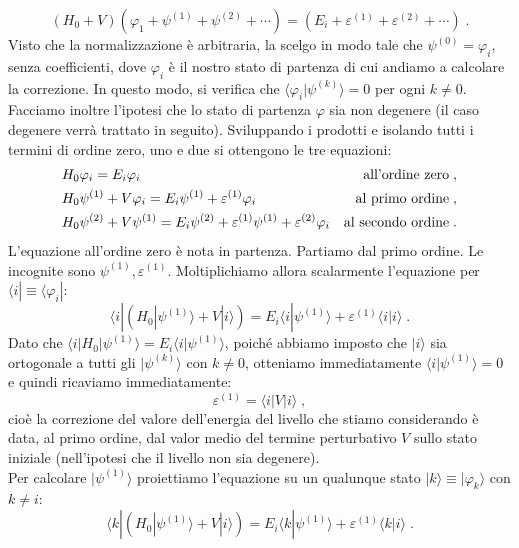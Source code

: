 \documentclass[10pt,a4paper]{report}
\theoremstyle{definition}
\numberwithin{equation}{section}
\newcommand{\bra}{\langle}
\newcommand{\ket}{\rangle}
\begin{document}
\begin{equation}
(H_0+V)(\varphi_1+\psi^{(1)}+\psi^{(2)}+\cdots)=(E_i+\varepsilon^{(1)}+\varepsilon^{(2)}+\cdots)\;.
\end{equation}
Visto che la normalizzazione è arbitraria, la scelgo in modo tale che $\psi^{(0)}=\varphi_i$, senza coefficienti, dove $\varphi_i$ è il nostro stato di partenza di cui andiamo a calcolare la correzione. In questo modo, si verifica che $\bra\varphi_i|\psi^{(k)}\ket=0$ per ogni $k\ne 0$. Facciamo inoltre l'ipotesi che lo stato di partenza $\varphi$ sia non degenere (il caso degenere verrà trattato in seguito). Sviluppando i prodotti e isolando tutti i termini di ordine zero, uno e due si ottengono le tre equazioni:
\begin{align}
&H_0\varphi_i = E_i\varphi_i &\mbox{all'ordine zero}\;, \notag \\
&H_0\psi^{(1)}+V\varphi_i = E_i\psi^{(1)}+\varepsilon^{(1)}\varphi_i &\mbox{al primo ordine} \notag\;, \\
&H_0\psi^{(2)}+V\psi^{(1)} = E_i\psi^{(2)}+\varepsilon^{(1)}\psi^{(1)}+\varepsilon^{(2)}\varphi_i &\mbox{al secondo ordine}\;.
\end{align}
L'equazione all'ordine zero è nota in partenza. Partiamo dal primo ordine. Le incognite sono $\psi^{(1)},\varepsilon^{(1)}$. Moltiplichiamo allora scalarmente l'equazione per $\bra i|\equiv \bra \varphi_i|$:
\begin{equation}
\bra i|\left(H_0|\psi^{(1)}\ket+V|i\ket\right)=E_i\bra i|\psi^{(1)}\ket+\varepsilon^{(1)}\bra i|i\ket\;.
\end{equation}
Dato che $\bra i|H_0|\psi^{(1)}\ket=E_i\bra i|\psi^{(1)}\ket$, poiché abbiamo imposto che $|i\ket$ sia ortogonale a tutti gli $|\psi^{(k)}\ket$ con $k\ne 0$, otteniamo immediatamente $\bra i|\psi^{(1)}\ket=0$ e quindi ricaviamo immediatamente:
\begin{equation}
\varepsilon^{(1)}=\bra i|V|i\ket\;,
\end{equation}
cioè la correzione del valore dell'energia del livello che stiamo considerando è data, al primo ordine, dal valor medio del termine perturbativo $V$ sullo stato iniziale (nell'ipotesi che il livello non sia degenere). \\
Per calcolare $|\psi^{(1)}\ket$ proiettiamo l'equazione su un qualunque stato $|k\ket\equiv |\varphi_k\ket$ con $k\ne i$:
\begin{equation*}
\bra k|\left(H_0|\psi^{(1)}\ket+V|i\ket\right)=E_i\bra k|\psi^{(1)}\ket+\varepsilon^{(1)}\bra k|i\ket\;.
\end{equation*}
\end{document}
